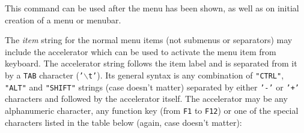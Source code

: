 







This command can be used after the menu has been shown, as well as on initial
creation of a menu or menubar.

The {\it item} string for the normal menu items (not submenus or separators)
may include the accelerator which can be used to activate the menu item
from keyboard. The accelerator string follows the item label and is separated
from it by a {\tt TAB} character ({\tt '$\backslash$t'}). Its general syntax is
any combination of {\tt "CTRL"}, {\tt "ALT"} and {\tt "SHIFT"} strings (case
doesn't matter) separated by either {\tt '-'} or {\tt '+'} characters and
followed by the accelerator itself. The accelerator may be any alphanumeric
character, any function key (from {\tt F1} to {\tt F12}) or one of the special
characters listed in the table below (again, case doesn't matter):

\begin{twocollist}\itemsep=0pt
\end{twocollist}


